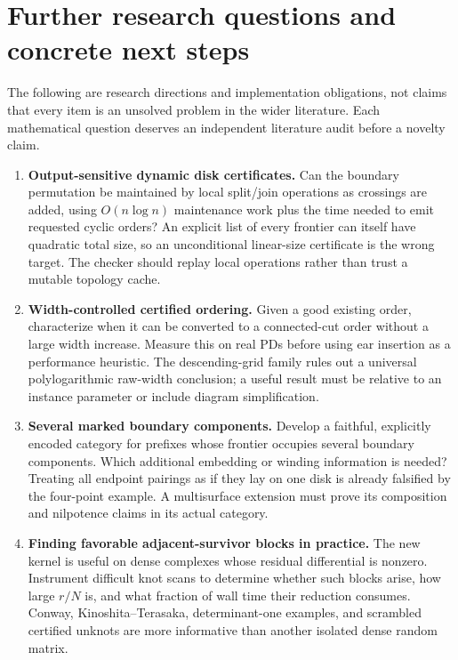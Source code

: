 \documentclass[11pt]{article}
\theoremstyle{definition}\newtheorem{definition}[theorem]{Definition}
\theoremstyle{remark}\newtheorem{remark}[theorem]{Remark}
\begin{document}
\section{Further research questions and concrete next steps}
\label{sec:future}
The following are research directions and implementation obligations, not claims
that every item is an unsolved problem in the wider literature. Each mathematical
question deserves an independent literature audit before a novelty claim.

\begin{enumerate}[label=\textbf{Q\arabic*.},leftmargin=2.8em,itemsep=7pt]
\item \textbf{Output-sensitive dynamic disk certificates.}
Can the boundary permutation be maintained by local split/join operations as
crossings are added, using $O(n\log n)$ maintenance work plus the time needed to
emit requested cyclic orders? An explicit list of every frontier can itself
have quadratic total size, so an unconditional linear-size certificate is the
wrong target. The checker should replay local operations rather than trust a
mutable topology cache.

\item \textbf{Width-controlled certified ordering.}
Given a good existing order, characterize when it can be converted to a
connected-cut order without a large width increase. Measure this on real PDs
before using ear insertion as a performance heuristic. The descending-grid
family rules out a universal polylogarithmic raw-width conclusion; a useful
result must be relative to an instance parameter or include diagram simplification.

\item \textbf{Several marked boundary components.}
Develop a faithful, explicitly encoded category for prefixes whose frontier
occupies several boundary components. Which additional embedding or winding
information is needed? Treating all endpoint pairings as if they lay on one
disk is already falsified by the four-point example. A multisurface extension
must prove its composition and nilpotence claims in its actual category.

\item \textbf{Finding favorable adjacent-survivor blocks in practice.}
The new kernel is useful on dense complexes whose residual differential is
nonzero. Instrument difficult knot scans to determine whether such blocks arise,
how large $r/N$ is, and what fraction of wall time their reduction consumes.
Conway, Kinoshita--Terasaka, determinant-one examples, and scrambled certified
unknots are more informative than another isolated dense random matrix.


\end{enumerate}
\end{document}
